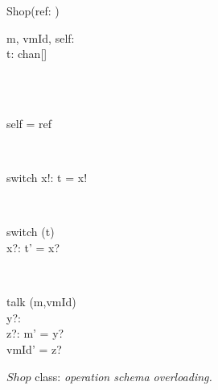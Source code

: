 \begin{figure}[H]
\centering
\begin{class}{Shop(ref: \integer)}
\\
\begin{state}
m, vmId, self: \integer
\\t: chan[\integer \times \integer]
\end{state} 
\\
\begin{init}
\\self = ref
\end{init} 
\\
\begin{op}{switch}
x!: \integer
\ST
t = x!
\end{op}
\\
\begin{op}{switch}
\Delta (t)
\\x?: \integer
\ST
t' = x?
\end{op}
\\
\begin{op}{talk}
\Delta (m,vmId)
\\y?: \integer
\\z?: \integer
\ST
m' = y?
\\vmId' = z?
\end{op}
\end{class}
\caption{$Shop$ class: \textit{operation schema overloading.}}
\label{fig_oz_overloaded_operation_shop}
\end{figure}
